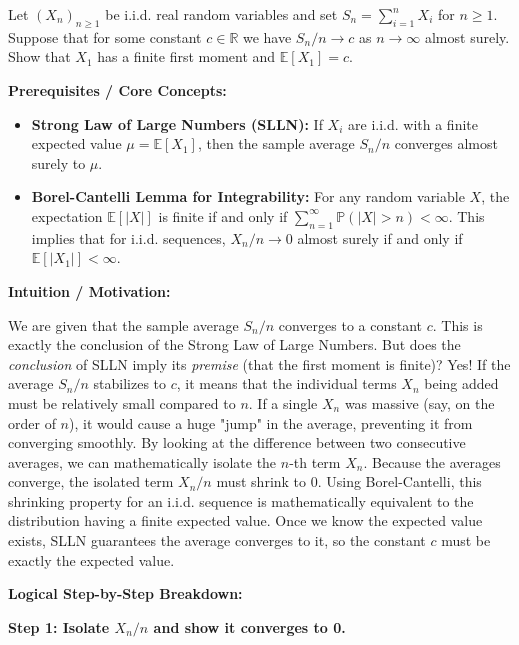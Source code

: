 \begin{exercise}\label{probability:2019:6}
Let $(X_n)_{n \geq 1}$ be i.i.d. real random variables and set $S_n = \sum_{i=1}^n X_i$ for $n \geq 1$. Suppose that for some constant $c \in \mathbb{R}$ we have $S_n/n \to c$ as $n \to \infty$ almost surely. Show that $X_1$ has a finite first moment and $\mathbb{E}[X_1] = c$.
\end{exercise}

\begin{solution}
\textbf{Prerequisites / Core Concepts:}
\begin{itemize}
    \item \textbf{Strong Law of Large Numbers (SLLN):} If $X_i$ are i.i.d. with a finite expected value $\mu = \mathbb{E}[X_1]$, then the sample average $S_n/n$ converges almost surely to $\mu$.
    \item \textbf{Borel-Cantelli Lemma for Integrability:} For any random variable $X$, the expectation $\mathbb{E}[|X|]$ is finite if and only if $\sum_{n=1}^\infty \mathbb{P}(|X| > n) < \infty$. This implies that for i.i.d. sequences, $X_n/n \to 0$ almost surely if and only if $\mathbb{E}[|X_1|] < \infty$.
\end{itemize}

\textbf{Intuition / Motivation:}

We are given that the sample average $S_n/n$ converges to a constant $c$. This is exactly the conclusion of the Strong Law of Large Numbers. But does the \textit{conclusion} of SLLN imply its \textit{premise} (that the first moment is finite)?
Yes! If the average $S_n/n$ stabilizes to $c$, it means that the individual terms $X_n$ being added must be relatively small compared to $n$. If a single $X_n$ was massive (say, on the order of $n$), it would cause a huge "jump" in the average, preventing it from converging smoothly. 
By looking at the difference between two consecutive averages, we can mathematically isolate the $n$-th term $X_n$. Because the averages converge, the isolated term $X_n / n$ must shrink to 0. Using Borel-Cantelli, this shrinking property for an i.i.d. sequence is mathematically equivalent to the distribution having a finite expected value. Once we know the expected value exists, SLLN guarantees the average converges to it, so the constant $c$ must be exactly the expected value.

\textbf{Logical Step-by-Step Breakdown:}

\textbf{Step 1: Isolate $X_n / n$ and show it converges to 0.}


\end{solution}
